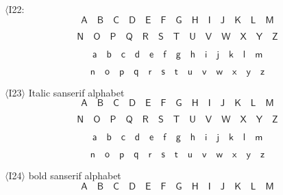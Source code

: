 \documentclass{book}
\begin{document}
$\langle$I22:
\[\mathsf{A}\quad \mathsf{B}\quad \mathsf{C}\quad \mathsf{D}\quad
	\mathsf{E}\quad \mathsf{F}\quad \mathsf{G}\quad \mathsf{H}\quad
	\mathsf{I}\quad \mathsf{J}\quad \mathsf{K}\quad \mathsf{L}\quad
	\mathsf{M}\]

\[\mathsf{N}\quad \mathsf{O}\quad \mathsf{P}\quad
	\mathsf{Q}\quad \mathsf{R}\quad \mathsf{S}\quad \mathsf{T}\quad
	\mathsf{U}\quad \mathsf{V}\quad \mathsf{W}\quad \mathsf{X}\quad
	\mathsf{Y}\quad \mathsf{Z}\]

\[\mathsf{a}\quad \mathsf{b}\quad
	\mathsf{c}\quad \mathsf{d}\quad \mathsf{e}\quad \mathsf{f}\quad
	\mathsf{g}\quad \mathsf{h}\quad \mathsf{i}\quad \mathsf{j}\quad
	\mathsf{k}\quad \mathsf{l}\quad \mathsf{m}\]

\[\mathsf{n}\quad
	\mathsf{o}\quad \mathsf{p}\quad \mathsf{q}\quad \mathsf{r}\quad
	\mathsf{s}\quad \mathsf{t}\quad \mathsf{u}\quad \mathsf{v}\quad
	\mathsf{w}\quad \mathsf{x}\quad \mathsf{y}\quad \mathsf{z}\]

$\langle$I23$\rangle$ Italic sanserif alphabet
\[\mathit{\mathsf{A}}\quad \mathit{\mathsf{B}}\quad \mathit{\mathsf{C}}\quad \mathit{\mathsf{D}}\quad
	\mathit{\mathsf{E}}\quad \mathit{\mathsf{F}}\quad \mathit{\mathsf{G}}\quad \mathit{\mathsf{H}}\quad
	\mathit{\mathsf{I}}\quad \mathit{\mathsf{J}}\quad \mathit{\mathsf{K}}\quad \mathit{\mathsf{L}}\quad
	\mathit{\mathsf{M}}\]

\[\mathit{\mathsf{N}}\quad \mathit{\mathsf{O}}\quad \mathit{\mathsf{P}}\quad
	\mathit{\mathsf{Q}}\quad \mathit{\mathsf{R}}\quad \mathit{\mathsf{S}}\quad \mathit{\mathsf{T}}\quad
	\mathit{\mathsf{U}}\quad \mathit{\mathsf{V}}\quad \mathit{\mathsf{W}}\quad \mathit{\mathsf{X}}\quad
	\mathit{\mathsf{Y}}\quad \mathit{\mathsf{Z}}\]

\[\mathit{\mathsf{a}}\quad \mathit{\mathsf{b}}\quad
	\mathit{\mathsf{c}}\quad \mathit{\mathsf{d}}\quad \mathit{\mathsf{e}}\quad \mathit{\mathsf{f}}\quad
	\mathit{\mathsf{g}}\quad \mathit{\mathsf{h}}\quad \mathit{\mathsf{i}}\quad \mathit{\mathsf{j}}\quad
	\mathit{\mathsf{k}}\quad \mathit{\mathsf{l}}\quad \mathit{\mathsf{m}}\]

\[\mathit{\mathsf{n}}\quad
	\mathit{\mathsf{o}}\quad \mathit{\mathsf{p}}\quad \mathit{\mathsf{q}}\quad \mathit{\mathsf{r}}\quad
	\mathit{\mathsf{s}}\quad \mathit{\mathsf{t}}\quad \mathit{\mathsf{u}}\quad \mathit{\mathsf{v}}\quad
	\mathit{\mathsf{w}}\quad \mathit{\mathsf{x}}\quad \mathit{\mathsf{y}}\quad \mathit{\mathsf{z}}\]

$\langle$I24$\rangle$ bold sanserif alphabet
\[\mathbf{\mathsf{A}}\quad \mathbf{\mathsf{B}}\quad \mathbf{\mathsf{C}}\quad \mathbf{\mathsf{D}}\quad
	\mathbf{\mathsf{E}}\quad \mathbf{\mathsf{F}}\quad \mathbf{\mathsf{G}}\quad \mathbf{\mathsf{H}}\quad
	\mathbf{\mathsf{I}}\quad \mathbf{\mathsf{J}}\quad \mathbf{\mathsf{K}}\quad \mathbf{\mathsf{L}}\quad
	\mathbf{\mathsf{M}}\]
\end{document}
